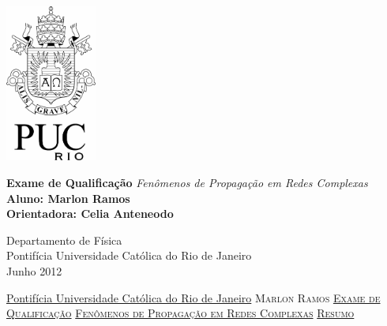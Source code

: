 \documentclass[a4paper,11pt]{report}
\newcommand{\linespacing}{1.5}
\renewcommand{\baselinestretch}{\linespacing}
\begin{document}




\thispagestyle{empty}
\begin{flushright}
\includegraphics[width=3cm]{puclogo}
\end{flushright}	
\vskip40mm
\begin{center}

\huge\textbf{Exame de Qualifica\c{c}\~ao}
\vskip2mm
\LARGE\textit{Fen\^omenos de Propaga\c{c}\~ao em Redes Complexas}
\vskip5mm
\Large\textbf{Aluno: Marlon Ramos}\\
\Large\textbf{Orientadora: Celia Anteneodo}
\normalsize
\end{center}
\vfill
\begin{flushleft}
\large
Departamento de F\'isica\\
Pontif\'icia Universidade Cat\'olica do Rio de Janeiro\\
Junho 2012
\end{flushleft}		


\thispagestyle{empty}
\newpage
\null\vskip10mm
\begin{center}
\large
\underline{Pontif\'icia Universidade Cat\'olica do Rio de Janeiro}
\vskip20mm
\textsc{Marlon Ramos}
\vskip20mm
\underline{\textsc{Exame de Qualifica\c{c}\~ao}}
\vskip0mm
\underline{\textsc{Fen\^omenos de Propaga\c{c}\~ao em Redes Complexas}}
\vskip20mm
\underline{\textsc{Resumo}}
\vskip2mm
\end{center}
\renewcommand{\baselinestretch}{1.0}
\small\normalsize
\end{document}
